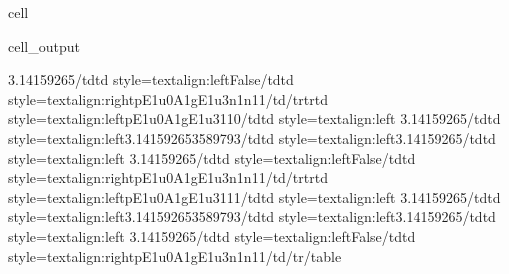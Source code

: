 \documentclass[letterpaper,table,10pt,english]{jupyterBook}
\begin{document}
\begin{sphinxuseclass}{cell}
\begin{sphinxVerbatimOutput}
\begin{sphinxuseclass}{cell_output}
\begin{sphinxVerbatim}[commandchars=\\\{\}]
3.14159265\PYGZlt{}/td\PYGZgt{}\PYGZlt{}td style=\PYGZbs{}\PYGZsq{}text\PYGZhy{}align:left\PYGZbs{}\PYGZsq{}\PYGZgt{}False\PYGZlt{}/td\PYGZgt{}\PYGZlt{}td style=\PYGZbs{}\PYGZsq{}text\PYGZhy{}align:right\PYGZbs{}\PYGZsq{}\PYGZgt{}p\PYGZus{}E1u\PYGZus{}0\PYGZus{}A1g\PYGZus{}E1u\PYGZus{}3\PYGZus{}n1\PYGZus{}n1\PYGZus{}1\PYGZlt{}/td\PYGZgt{}\PYGZlt{}/tr\PYGZgt{}\PYGZlt{}tr\PYGZgt{}\PYGZlt{}td style=\PYGZbs{}\PYGZsq{}text\PYGZhy{}align:left\PYGZbs{}\PYGZsq{}\PYGZgt{}p\PYGZus{}E1u\PYGZus{}0\PYGZus{}A1g\PYGZus{}E1u\PYGZus{}3\PYGZus{}1\PYGZus{}1\PYGZus{}0\PYGZlt{}/td\PYGZgt{}\PYGZlt{}td style=\PYGZbs{}\PYGZsq{}text\PYGZhy{}align:left\PYGZbs{}\PYGZsq{}\PYGZgt{} 3.14159265\PYGZlt{}/td\PYGZgt{}\PYGZlt{}td style=\PYGZbs{}\PYGZsq{}text\PYGZhy{}align:left\PYGZbs{}\PYGZsq{}\PYGZgt{}3.141592653589793\PYGZlt{}/td\PYGZgt{}\PYGZlt{}td style=\PYGZbs{}\PYGZsq{}text\PYGZhy{}align:left\PYGZbs{}\PYGZsq{}\PYGZgt{}\PYGZhy{}3.14159265\PYGZlt{}/td\PYGZgt{}\PYGZlt{}td style=\PYGZbs{}\PYGZsq{}text\PYGZhy{}align:left\PYGZbs{}\PYGZsq{}\PYGZgt{} 3.14159265\PYGZlt{}/td\PYGZgt{}\PYGZlt{}td style=\PYGZbs{}\PYGZsq{}text\PYGZhy{}align:left\PYGZbs{}\PYGZsq{}\PYGZgt{}False\PYGZlt{}/td\PYGZgt{}\PYGZlt{}td style=\PYGZbs{}\PYGZsq{}text\PYGZhy{}align:right\PYGZbs{}\PYGZsq{}\PYGZgt{}p\PYGZus{}E1u\PYGZus{}0\PYGZus{}A1g\PYGZus{}E1u\PYGZus{}3\PYGZus{}n1\PYGZus{}n1\PYGZus{}1\PYGZlt{}/td\PYGZgt{}\PYGZlt{}/tr\PYGZgt{}\PYGZlt{}tr\PYGZgt{}\PYGZlt{}td style=\PYGZbs{}\PYGZsq{}text\PYGZhy{}align:left\PYGZbs{}\PYGZsq{}\PYGZgt{}p\PYGZus{}E1u\PYGZus{}0\PYGZus{}A1g\PYGZus{}E1u\PYGZus{}3\PYGZus{}1\PYGZus{}1\PYGZus{}1\PYGZlt{}/td\PYGZgt{}\PYGZlt{}td style=\PYGZbs{}\PYGZsq{}text\PYGZhy{}align:left\PYGZbs{}\PYGZsq{}\PYGZgt{} 3.14159265\PYGZlt{}/td\PYGZgt{}\PYGZlt{}td style=\PYGZbs{}\PYGZsq{}text\PYGZhy{}align:left\PYGZbs{}\PYGZsq{}\PYGZgt{}3.141592653589793\PYGZlt{}/td\PYGZgt{}\PYGZlt{}td style=\PYGZbs{}\PYGZsq{}text\PYGZhy{}align:left\PYGZbs{}\PYGZsq{}\PYGZgt{}\PYGZhy{}3.14159265\PYGZlt{}/td\PYGZgt{}\PYGZlt{}td style=\PYGZbs{}\PYGZsq{}text\PYGZhy{}align:left\PYGZbs{}\PYGZsq{}\PYGZgt{} 3.14159265\PYGZlt{}/td\PYGZgt{}\PYGZlt{}td style=\PYGZbs{}\PYGZsq{}text\PYGZhy{}align:left\PYGZbs{}\PYGZsq{}\PYGZgt{}False\PYGZlt{}/td\PYGZgt{}\PYGZlt{}td style=\PYGZbs{}\PYGZsq{}text\PYGZhy{}align:right\PYGZbs{}\PYGZsq{}\PYGZgt{}p\PYGZus{}E1u\PYGZus{}0\PYGZus{}A1g\PYGZus{}E1u\PYGZus{}3\PYGZus{}n1\PYGZus{}n1\PYGZus{}1\PYGZlt{}/td\PYGZgt{}\PYGZlt{}/tr\PYGZgt{}\PYGZlt{}/table\PYGZgt{}\PYGZsq{}
\end{sphinxVerbatim}

\end{sphinxuseclass}\end{sphinxVerbatimOutput}

\end{sphinxuseclass}
\end{document}

